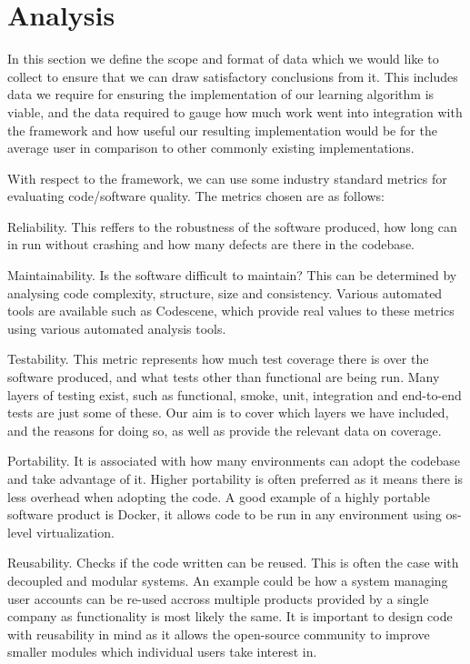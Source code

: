\section{Analysis}
In this section we define the scope and format of data which we would like to collect to ensure that we can draw satisfactory conclusions from it.
This includes data we require for ensuring the implementation of our learning algorithm is viable, and the data required to gauge how much work went into integration with the framework and how useful our resulting implementation would be for the average user in comparison to other commonly existing implementations.

With respect to the framework, we can use some industry standard metrics for evaluating code/software quality.
The metrics chosen are as follows:

Reliability.
This reffers to the robustness of the software produced, how long can in run without crashing and how many defects are there in the codebase.

Maintainability.
Is the software difficult to maintain?
This can be determined by analysing code complexity, structure, size and consistency.
Various automated tools are available such as Codescene, which provide real values to these metrics using various automated analysis tools.

Testability.
This metric represents how much test coverage there is over the software produced, and what tests other than functional are being run.
Many layers of testing exist, such as functional, smoke,  unit, integration and end-to-end tests are just some of these.
Our aim is to cover which layers we have included, and the reasons for doing so, as well as provide the relevant data on coverage.

Portability.
It is associated with how many environments can adopt the codebase and take advantage of it.
Higher portability is often preferred as it means there is less overhead when adopting the code.
A good example of a highly portable software product is Docker, it allows code to be run in any environment using os-level virtualization.

Reusability.
Checks if the code written can be reused.
This is often the case with decoupled and modular systems.
An example could be how a system managing user accounts can be re-used accross multiple products provided by a single company as functionality is most likely the same.
It is important to design code with reusability in mind as it allows the open-source community to improve smaller modules which individual users take interest in.



